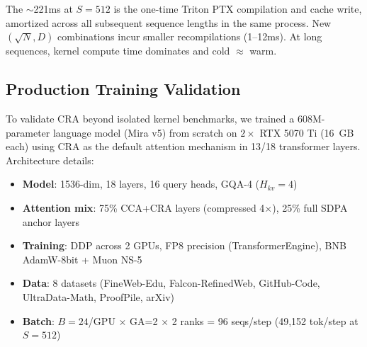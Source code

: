 \documentclass{article}
\begin{document}
    The $\sim$221ms at $S=512$ is the one-time Triton PTX compilation and cache write, amortized across all subsequent sequence lengths in the same process. New $(\sqrt{N}, D)$ combinations incur smaller recompilations (1--12ms). At long sequences, kernel compute time dominates and cold $\approx$ warm.

    \subsection{Production Training Validation}
    \label{sec:training_validation}

    To validate CRA beyond isolated kernel benchmarks, we trained a 608M-parameter language model (Mira v5) from scratch on $2\times$ RTX 5070 Ti (16~GB each) using CRA as the default attention mechanism in 13/18 transformer layers. Architecture details:

    \begin{itemize}
        \item \textbf{Model}: 1536-dim, 18 layers, 16 query heads, GQA-4 ($H_{kv}=4$)
        \item \textbf{Attention mix}: 75\% CCA+CRA layers (compressed 4$\times$), 25\% full SDPA anchor layers
        \item \textbf{Training}: DDP across 2 GPUs, FP8 precision (TransformerEngine), BNB AdamW-8bit + Muon NS-5
        \item \textbf{Data}: 8 datasets (FineWeb-Edu, Falcon-RefinedWeb, GitHub-Code, UltraData-Math, ProofPile, arXiv)
        \item \textbf{Batch}: $B=24$/GPU $\times$ GA=2 $\times$ 2 ranks = 96 seqs/step (49,152 tok/step at $S=512$)
    \end{itemize}
\end{document}
